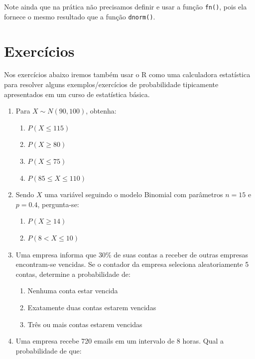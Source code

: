 \documentclass[10pt,a4paper]{book}
\providecommand{\tightlist}{%
  \setlength{\itemsep}{0pt}\setlength{\parskip}{0pt}}
\begin{document}
Note ainda que na prática não precisamos definir e usar a função
\texttt{fn()}, pois ela fornece o mesmo resultado que a função
\texttt{dnorm()}.

\section*{Exercícios}\label{exercicios-14}


Nos exercícios abaixo iremos também usar o R como uma calculadora
estatística para resolver alguns exemplos/exercícios de probabilidade
tipicamente apresentados em um curso de estatística básica.

\begin{enumerate}
\def\labelenumi{\arabic{enumi}.}
\tightlist
\item
  Para \(X \sim N(90, 100)\), obtenha:

  \begin{enumerate}
  \def\labelenumii{\alph{enumii}.}
  \tightlist
  \item
    \(P(X \leq 115)\)
  \item
    \(P(X \geq 80)\)
  \item
    \(P(X \leq 75)\)
  \item
    \(P(85 \leq X \leq 110)\) 
  \end{enumerate}
\item
  Sendo \(X\) uma variável seguindo o modelo Binomial com parâmetros
  \(n = 15\) e \(p = 0.4\), pergunta-se:

  \begin{enumerate}
  \def\labelenumii{\alph{enumii}.}
  \tightlist
  \item
    \(P(X \geq 14)\)
  \item
    \(P(8 < X \leq 10)\) 
  \end{enumerate}
\item
  Uma empresa informa que 30\% de suas contas a receber de outras
  empresas encontram-se vencidas. Se o contador da empresa seleciona
  aleatoriamente 5 contas, determine a probabilidade de:

  \begin{enumerate}
  \def\labelenumii{\alph{enumii}.}
  \tightlist
  \item
    Nenhuma conta estar vencida
  \item
    Exatamente duas contas estarem vencidas
  \item
    Três ou mais contas estarem vencidas
  \end{enumerate}
\item
  Uma empresa recebe 720 emails em um intervalo de 8 horas. Qual a
  probabilidade de que:


\end{enumerate}
\end{document}

